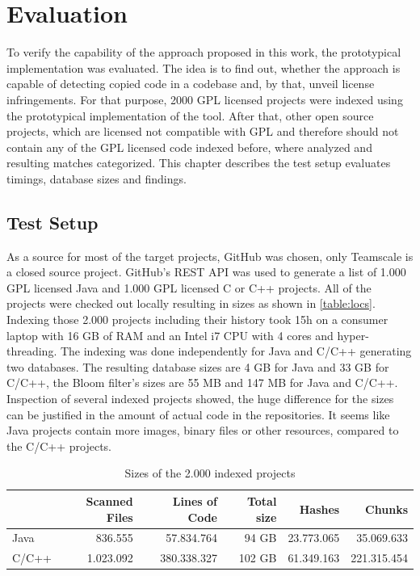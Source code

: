 
\chapter{Evaluation}\label{chapter:evaluation}
To verify the capability of the approach proposed in this work, the prototypical implementation was evaluated.
The idea is to find out, whether the approach is capable of detecting copied code in a codebase and, by that, unveil license infringements.
For that purpose, 2000 GPL licensed projects were indexed using the prototypical implementation of the tool.
After that, other open source projects, which are licensed not compatible with GPL and therefore should not contain any of the GPL licensed code indexed before, where analyzed and resulting matches categorized.
This chapter describes the test setup evaluates timings, database sizes and findings.

\section{Test Setup}\label{section:evaluation/test_setup}
As a source for most of the target projects, GitHub was chosen, only Teamscale is a closed source project.
GitHub's REST API was used to generate a list of 1.000 GPL licensed Java and 1.000 GPL licensed C or C++ projects.
All of the projects were checked out locally resulting in sizes as shown in \autoref{table:locs}.
Indexing those 2.000 projects including their history took 15h on a consumer laptop with 16 GB of RAM and an Intel i7 CPU with 4 cores and hyper-threading.
The indexing was done independently for Java and C/C++ generating two databases.
The resulting database sizes are 4 GB for Java and 33 GB for C/C++, the Bloom filter's sizes are 55 MB and 147 MB for Java and C/C++.
Inspection of several indexed projects showed, the huge difference for the sizes can be justified in the amount of actual code in the repositories.
It seems like Java projects contain more images, binary files or other resources, compared to the C/C++ projects.

\begin{table}[ht]
	\centering
	\begin{tabular}{l|rrrrr}
		& \textbf{Scanned Files} & \textbf{Lines of Code} & \textbf{Total size} & \textbf{Hashes} & \textbf{Chunks} \\ 
		\hline 
		Java & 836.555 & 57.834.764 & 94 GB & 23.773.065 & 35.069.633 \\
		C/C++ & 1.023.092 & 380.338.327 & 102 GB & 61.349.163 & 221.315.454 \\ 
	\end{tabular}
	\caption{Sizes of the 2.000 indexed projects}\label{table:locs}
\end{table}


